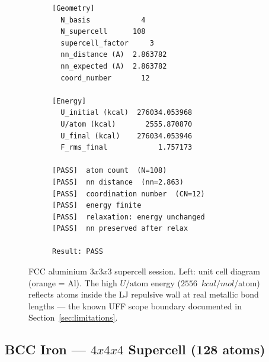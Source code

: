 \documentclass[11pt,twoside]{article}
\def\times{x}%
\def\kcalmol{kcal/mol}%
\newcommand{\kcalmol}{\text{kcal/mol}}
\begin{document}
\begin{figure}[H]
\begin{subfigure}[b]{0.50\textwidth}
\begin{lstlisting}[language={}, basicstyle=\ttfamily\scriptsize,
  frame=single, caption={Session: \texttt{xtal\_001\_fcc\_al}}]
[Geometry]
  N_basis            4
  N_supercell      108
  supercell_factor     3
  nn_distance (A)  2.863782
  nn_expected (A)  2.863782
  coord_number       12

[Energy]
  U_initial (kcal)  276034.053968
  U/atom (kcal)       2555.870870
  U_final (kcal)    276034.053946
  F_rms_final            1.757173

[PASS]  atom count  (N=108)
[PASS]  nn distance  (nn=2.863)
[PASS]  coordination number  (CN=12)
[PASS]  energy finite
[PASS]  relaxation: energy unchanged
[PASS]  nn preserved after relax

Result: PASS
\end{lstlisting}
\end{subfigure}
\caption{FCC aluminium $3{\times}3{\times}3$ supercell session. Left: unit cell diagram (orange = Al). The high $U/\mathrm{atom}$ energy ($2556$~$\kcalmol$/atom) reflects atoms inside the LJ repulsive wall at real metallic bond lengths --- the known UFF scope boundary documented in Section~\ref{sec:limitations}.}
\label{fig:fcc-al}
\end{figure}

\subsection{BCC Iron --- $4 \times 4 \times 4$ Supercell (128 atoms)}
\end{document}
